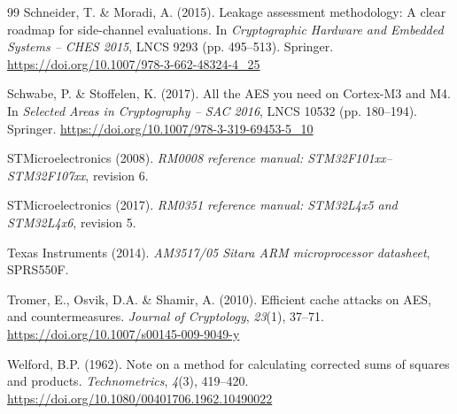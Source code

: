 \documentclass[11pt, a4paper, twoside, reqno]{article}
\begin{document}
\begin{thebibliography}{99}
Schneider, T. \& Moradi, A. (2015). Leakage assessment methodology: A clear roadmap for side-channel evaluations. In \emph{Cryptographic Hardware and Embedded Systems -- CHES 2015}, LNCS 9293 (pp. 495--513). Springer. \url{https://doi.org/10.1007/978-3-662-48324-4_25}

Schwabe, P. \& Stoffelen, K. (2017). All the AES you need on Cortex-M3 and M4. In \emph{Selected Areas in Cryptography -- SAC 2016}, LNCS 10532 (pp. 180--194). Springer. \url{https://doi.org/10.1007/978-3-319-69453-5_10}

STMicroelectronics (2008). \emph{RM0008 reference manual: STM32F101xx--STM32F107xx}, revision 6.

STMicroelectronics (2017). \emph{RM0351 reference manual: STM32L4x5 and STM32L4x6}, revision 5.

Texas Instruments (2014). \emph{AM3517/05 Sitara ARM microprocessor datasheet}, SPRS550F.

Tromer, E., Osvik, D.A. \& Shamir, A. (2010). Efficient cache attacks on AES, and countermeasures. \emph{Journal of Cryptology}, \emph{23}(1), 37--71. \url{https://doi.org/10.1007/s00145-009-9049-y}

Welford, B.P. (1962). Note on a method for calculating corrected sums of squares and products. \emph{Technometrics}, \emph{4}(3), 419--420. \url{https://doi.org/10.1080/00401706.1962.10490022}

\end{thebibliography}
\end{document}
